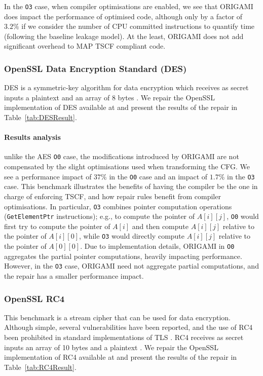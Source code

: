 In the \texttt{O3} case, when compiler optimisations are enabled, we see that ORIGAMI does impact the performance of optimised code, although only by a factor of $3.2\%$ if we consider the number of CPU committed instructions to quantify time (following the baseline leakage model). At the least, ORIGAMI does not add significant overhead to MAP TSCF compliant code.

\subsubsection{OpenSSL Data Encryption Standard (DES)}
DES is a symmetric-key algorithm for data encryption which receives as secret inputs a plaintext %
 and an array of 8 bytes%
. %
We repair the OpenSSL implementation of DES available at \cite{OpenSSL} and present the results of the repair in Table~\ref{tab:DESResult}. %

\paragraph*{Results analysis} unlike the AES \texttt{O0} case, the modifications introduced by ORIGAMI are not compensated by the slight optimisations used when transforming the CFG. We see a performance impact of $37\%$ in the \texttt{O0} case and an impact of $1.7\%$ in the \texttt{O3} case. This benchmark illustrates the benefits of having the compiler be the one in charge of enforcing TSCF, and how repair rules benefit from compiler optimisations. In particular, \texttt{O3} combines pointer computation operations (\texttt{GetElementPtr} instructions); e.g., to compute the pointer of $A[i][j]$, \texttt{O0} would first try to compute the pointer of $A[i]$ and then compute $A[i][j]$ relative to the pointer of $A[i][0]$, while \texttt{O3} would directly compute $A[i][j]$ relative to the pointer of $A[0][0]$. Due to implementation details, ORIGAMI in \texttt{O0} aggregates the partial pointer computations, heavily impacting performance. However, in the \texttt{O3} case, ORIGAMI need not aggregate partial computations, and the repair has a smaller performance impact.
 
\subsubsection{OpenSSL RC4}
This benchmark is a stream cipher that can be used for data encryption. Although simple, several vulnerabilities have been reported, and the use of RC4 been prohibited in standard implementations of TLS \cite{rfc7465}. RC4 receives as secret inputs an array of 10 bytes %
and a plaintext%
 .%
  We repair the OpenSSL implementation of RC4 available at \cite{OpenSSL} and present the results of the repair in Table~\ref{tab:RC4Result}. 
 
